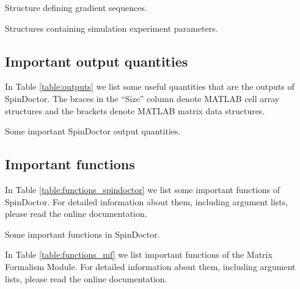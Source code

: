 \documentclass[a4paper]{article}
\begin{document}
\begin{table}
    
    \caption{Structure defining gradient sequences.}
    \label{table:setup_gradient}
\end{table}

\begin{table}
    
    \caption{Structures containing simulation experiment parameters.}
    \label{table:setup_experiments}
\end{table}


\subsection{Important output quantities}

In Table \ref{table:outputs} we list some useful quantities that are the outputs of SpinDoctor. The braces in the ``Size'' column denote MATLAB cell array structures and the brackets denote MATLAB matrix data structures.

\begin{table}
    \centering
    
    \caption{Some important SpinDoctor output quantities.}
    \label{table:outputs}
\end{table}

%   


\subsection{Important functions}

In Table \ref{table:functions_spindoctor} we list some important functions of SpinDoctor. For detailed information about them, including argument lists, please read the online documentation.

\begin{table}
    \centering
    
    \caption{Some important functions in SpinDoctor.}
    \label{table:functions_spindoctor}
\end{table}


In Table \ref{table:functions_mf} we list important functions of the Matrix Formalism Module. For detailed information about them, including argument lists, please read the online documentation.
\end{document}
